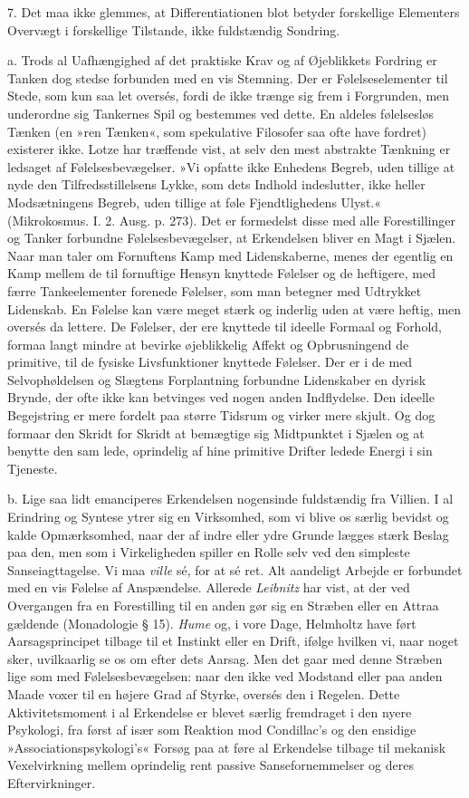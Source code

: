 \documentclass[12pt,a4paper,openany]{book}
\newcommand{\opage}[1]{\marginnote{\footnotesize\textit{[#1]}}}
\begin{document}
7. Det maa ikke glemmes, at Differentiationen blot betyder forskellige
Elementers Overvægt i forskellige Tilstande, ikke fuldstændig Sondring.

a. Trods al Uafhængighed af det praktiske Krav og af Øjeblikkets
Fordring er Tanken dog stedse forbunden med en vis Stemning. Der er
Følelseselementer til Stede, som kun saa let oversés, fordi de ikke
trænge sig frem i Forgrunden, men underordne sig Tankernes Spil og
bestemmes ved dette. En aldeles følelsesløs Tænken (en »ren Tænken«, som
spekulative Filosofer saa ofte have fordret) existerer ikke. Lotze har
træffende vist, at selv den mest abstrakte Tænkning er ledsaget af
Følelsesbevægelser. »Vi opfatte ikke Enhedens Begreb, uden tillige at
nyde den Tilfredsstillelsens Lykke, som dets Indhold indeslutter, ikke
heller Modsætningens Begreb, uden tillige at føle Fjendtlighedens
Ulyst.« (Mikrokosmus. I. 2. Ausg. p. 273). Det er formedelst disse med
alle Forestillinger og Tanker forbundne Følelsesbevægelser, at
Erkendelsen bliver en Magt i Sjælen. Naar man taler om Fornuftens Kamp
med Lidenskaberne, menes der egentlig en Kamp mellem de til fornuftige
Hensyn knyttede Følelser og de heftigere, med færre Tankeelementer
forenede Følelser, som man betegner med Udtrykket Lidenskab. En Følelse
kan være meget stærk og inderlig uden at være heftig, men oversés da
lettere. De Følelser, der ere knyttede til ideelle Formaal og Forhold,
formaa langt mindre at bevirke øjeblikkelig Affekt og Opbrusningend de
primitive, til de fysiske Livsfunktioner knyttede Følelser. Der er i de
med Selvophøldelsen og Slægtens Forplantning forbundne Lidenskaber en
dyrisk Brynde, der ofte ikke kan betvinges ved nogen anden Indflydelse.
Den ideelle Begejstring er mere fordelt paa større Tidsrum og virker
mere skjult. Og dog formaar den Skridt for Skridt at bemægtige sig
Midtpunktet i Sjælen og at benytte den sam%
\opage{113}lede, oprindelig af hine primitive Drifter ledede Energi i
sin Tjeneste.

b. Lige saa lidt emanciperes Erkendelsen nogensinde fuldstændig fra
Villien. I al Erindring og Syntese ytrer sig en Virksomhed, som vi blive
os særlig bevidst og kalde Opmærksomhed, naar der af indre eller ydre
Grunde lægges stærk Beslag paa den, men som i Virkeligheden spiller en
Rolle selv ved den simpleste Sanseiagttagelse. Vi maa \emph{ville} sé,
for at sé ret. Alt aandeligt Arbejde er forbundet med en vis Følelse af
Anspændelse. Allerede \emph{Leibnitz} har vist, at der ved Overgangen
fra en Forestilling til en anden gør sig en Stræben eller en Attraa
gældende (Monadologie § 15). \emph{Hume} og, i vore Dage, Helmholtz have
ført Aarsagsprincipet tilbage til et Instinkt eller en Drift, ifølge
hvilken vi, naar noget sker, uvilkaarlig se os om efter dets Aarsag. Men
det gaar med denne Stræben lige som med Følelsesbevægelsen: naar den
ikke ved Modstand eller paa anden Maade voxer til en højere Grad af
Styrke, oversés den i Regelen. Dette Aktivitetsmoment i al Erkendelse er
blevet særlig fremdraget i den nyere Psykologi, fra først af især som
Reaktion mod Condillac’s og den ensidige »Associationspsykologi’s«
Forsøg paa at føre al Erkendelse tilbage til mekanisk Vexelvirkning
mellem oprindelig rent passive Sansefornemmelser og deres
Eftervirkninger.
\end{document}
